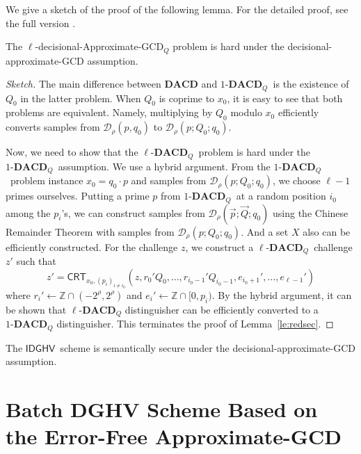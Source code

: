 \documentclass{llncs}
\newcommand{\Z}{{\mathbb Z}}
\newcommand*{\crt}{\ensuremath{\mathsf{CRT}}}
\newcommand*{\CDGHV}{\ensuremath{\mathsf{IDGHV}}}
\newcommand*{\lDACD}{\ensuremath{\ell\textbf{-}\mathbf{DACD}_Q}}
\newcommand*{\DACD}{\ensuremath{1\textbf{-}\mathbf{DACD}_Q}}
\newcommand*\D{\ensuremath{\mathcal D}}
\begin{document}
We give a sketch of the proof of the following lemma. For the detailed proof, see the full version \cite{KLYC2013}. 
\begin{lemma}
\label{le:redsec}
The $\ell$-decisional-Approximate-GCD$_Q$ problem is hard under the
decisional-approximate-GCD assumption.
\end{lemma}
\begin{proof}[Sketch] The main difference between $\mathbf{DACD}$ and \DACD\  is the existence of $Q_0$ in the latter problem. When $Q_0$ is coprime to $x_0$, it is easy to see that both problems are equivalent. Namely, multiplying by $Q_0$ modulo $x_0$ efficiently converts samples from $\D_\rho(p,q_0)$ to $\D_\rho(p; Q_0; q_0)$. 

Now, we need to show that the \lDACD\ problem is hard under the
\DACD\ assumption. We use a hybrid argument. From the
\DACD\ problem instance $x_0=q_0\cdot p$ and samples from $\D_\rho(p;
Q_0; q_0)$, we choose $\ell-1$ primes ourselves. Putting a prime $p$
from \DACD\ at a random position $i_0$ among the $p_i$'s, we can
construct samples from $\D_{\rho}(\vec{p};\vec{Q};q_0)$ using the Chinese
Remainder Theorem with samples from $\D_\rho(p; Q_0; q_0)$. And a set
$X$ also can be efficiently constructed. For the challenge $z$, we
construct a \lDACD\  challenge $z'$ such that  
\begin{equation*}
z'=\crt_{x_0,(p_i)_{i\neq i_0}}(z,r_{0}'Q_0,\dots,r_{i_0-1}'Q_{i_0-1},e_{i_0+1}',\dots,e_{\ell-1}') 
\end{equation*}
where $r_i'\gets\Z\cap (-2^\rho,2^\rho)$ and $e_i'\gets\Z\cap[0,p_i)$. By the hybrid argument, it can be shown that $\lDACD$ distinguisher can be efficiently converted to a $\DACD$ distinguisher. This terminates the proof of Lemma~\ref{le:redsec}.

\end{proof}
\begin{corollary}
The \CDGHV \ scheme is semantically secure under the
decisional-approximate-GCD assumption.
\end{corollary}

\section{Batch DGHV Scheme Based on the Error-Free Approximate-GCD}\label{sec:batch-error-free}
\end{document}
